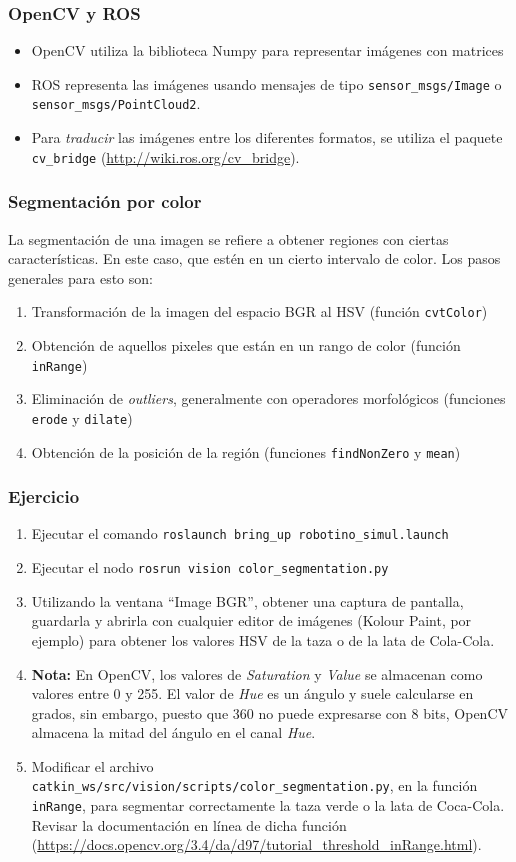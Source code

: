 \documentclass[10pt,spanish,aspectratio=1610]{beamer}
\begin{document}
\begin{frame}\frametitle{OpenCV y ROS}
  \begin{itemize}
  \item OpenCV utiliza la biblioteca Numpy para representar imágenes con matrices
  \item ROS representa las imágenes usando mensajes de tipo \texttt{sensor\_msgs/Image} o \texttt{sensor\_msgs/PointCloud2}.
  \item Para \textit{traducir} las imágenes entre los diferentes formatos, se utiliza el paquete \texttt{cv\_bridge} (\url{http://wiki.ros.org/cv_bridge}).
  \end{itemize}
\end{frame}

\begin{frame}\frametitle{Segmentación por color}
  La segmentación de una imagen se refiere a obtener regiones con ciertas características. En este caso, que estén en un cierto intervalo de color. Los pasos generales para esto son:
  \begin{enumerate}
  \item Transformación de la imagen del espacio BGR al HSV (función \texttt{cvtColor})
  \item Obtención de aquellos pixeles que están en un rango de color (función \texttt{inRange})
  \item Eliminación de \textit{outliers}, generalmente con operadores morfológicos (funciones \texttt{erode} y \texttt{dilate})
  \item Obtención de la posición de la región (funciones \texttt{findNonZero} y \texttt{mean})
  \end{enumerate}
\end{frame}

\begin{frame}\frametitle{Ejercicio}
  \begin{enumerate}
  \item Ejecutar el comando \texttt{roslaunch bring\_up robotino\_simul.launch}
  \item Ejecutar el nodo \texttt{rosrun vision color\_segmentation.py}
  \item Utilizando la ventana ``Image BGR'', obtener una captura de pantalla, guardarla y abrirla con cualquier editor de imágenes (Kolour Paint, por ejemplo) para obtener los valores HSV de la taza o de la lata de Cola-Cola.
    \item \textbf{Nota:} En OpenCV, los valores de \textit{Saturation} y \textit{Value} se almacenan como valores entre 0 y 255. El valor de \textit{Hue} es un ángulo y suele calcularse en grados, sin embargo, puesto que 360 no puede expresarse con 8 bits, OpenCV almacena la mitad del ángulo en el canal \textit{Hue}. 
  \item Modificar el archivo \texttt{catkin\_ws/src/vision/scripts/color\_segmentation.py}, en la función \texttt{inRange}, para segmentar correctamente la taza verde o la lata de Coca-Cola. Revisar la documentación en línea de dicha función (\url{https://docs.opencv.org/3.4/da/d97/tutorial_threshold_inRange.html}). 
  \end{enumerate}
\end{frame}
\end{document}
